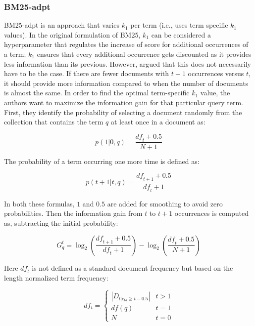 \subsubsection{BM25-adpt~\citep{bm25-adpt}}
BM25-adpt is an approach that varies $k_1$ per term (i.e., uses term specific $k_1$ values). In the original formulation of BM25, $k_1$ can be considered a hyperparameter that regulates the increase of score for additional occurrences of a term; $k_1$ ensures that every additional occurrence gets discounted as it provides less information than its previous. However, \citeauthor{bm25-adpt} argued that this does not necessarily have to be the case. If there are fewer documents with $t+1$ occurrences versus $t$, it should provide more information compared to when the number of documents is almost the same. In order to find the optimal term-specific $k_1$ value, the authors want to maximize the information gain for that particular query term. 
First, they identify the probability of selecting a document randomly from the collection that contains the term $q$ at least once in a document as:

\begin{equation}
	p(1|0,q) = \frac{\mathit{df}_t+0.5}{N+1}
\end{equation}

The probability of a term occurring one more time is defined as:

\begin{equation}
	p(t+1|t,q) = \frac{\mathit{df}_{t+1}+0.5}{\mathit{df}_t+1}
\end{equation}

In both these formulas, $1$ and $0.5$ are added for smoothing to avoid zero probabilities. Then the information gain from $t$ to $t+1$ occurrences is computed as, subtracting the initial probability: 

\begin{equation}
	G^t_q = \log_2\left(\frac{\mathit{df}_{t+1} + 0.5}{\mathit{df}_t+1}\right) - \log_2 \left(\frac{\mathit{df}_{t} + 0.5}{N+1}\right)
\end{equation}

Here $\mathit{df}_t$ is not defined as a standard document frequency but based on the length normalized term frequency:

\begin{equation}
	df_t = 
	\begin{cases}
		|D_{t|c_{td}\geq t-0.5}| & t > 1\\ 
		df(q) & t = 1\\
		N & t = 0
	\end{cases}
\end{equation}

